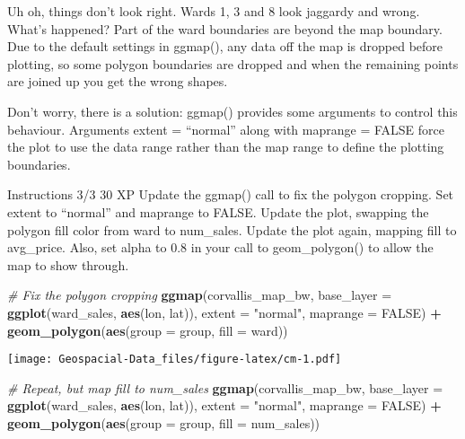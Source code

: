 \documentclass[]{article}
\newenvironment{Shaded}{\begin{snugshade}}{\end{snugshade}}
\newcommand{\CommentTok}[1]{\textcolor[rgb]{0.56,0.35,0.01}{\textit{#1}}}
\newcommand{\DataTypeTok}[1]{\textcolor[rgb]{0.13,0.29,0.53}{#1}}
\newcommand{\KeywordTok}[1]{\textcolor[rgb]{0.13,0.29,0.53}{\textbf{#1}}}
\newcommand{\NormalTok}[1]{#1}
\newcommand{\OperatorTok}[1]{\textcolor[rgb]{0.81,0.36,0.00}{\textbf{#1}}}
\newcommand{\OtherTok}[1]{\textcolor[rgb]{0.56,0.35,0.01}{#1}}
\newcommand{\StringTok}[1]{\textcolor[rgb]{0.31,0.60,0.02}{#1}}
\begin{document}
Uh oh, things don't look right. Wards 1, 3 and 8 look jaggardy and
wrong. What's happened? Part of the ward boundaries are beyond the map
boundary. Due to the default settings in ggmap(), any data off the map
is dropped before plotting, so some polygon boundaries are dropped and
when the remaining points are joined up you get the wrong shapes.

Don't worry, there is a solution: ggmap() provides some arguments to
control this behaviour. Arguments extent = ``normal'' along with
maprange = FALSE force the plot to use the data range rather than the
map range to define the plotting boundaries.

Instructions 3/3 30 XP Update the ggmap() call to fix the polygon
cropping. Set extent to ``normal'' and maprange to FALSE. Update the
plot, swapping the polygon fill color from ward to num\_sales. Update
the plot again, mapping fill to avg\_price. Also, set alpha to 0.8 in
your call to geom\_polygon() to allow the map to show through.

\begin{Shaded}
\begin{Highlighting}[]
\CommentTok{# Fix the polygon cropping}
\KeywordTok{ggmap}\NormalTok{(corvallis_map_bw, }
      \DataTypeTok{base_layer =} \KeywordTok{ggplot}\NormalTok{(ward_sales, }\KeywordTok{aes}\NormalTok{(lon, lat)), }\DataTypeTok{extent =} \StringTok{"normal"}\NormalTok{, }\DataTypeTok{maprange =} \OtherTok{FALSE}\NormalTok{) }\OperatorTok{+}
\StringTok{  }\KeywordTok{geom_polygon}\NormalTok{(}\KeywordTok{aes}\NormalTok{(}\DataTypeTok{group =}\NormalTok{ group, }\DataTypeTok{fill =}\NormalTok{ ward))}
\end{Highlighting}
\end{Shaded}

\texttt{[image: Geospacial-Data\_files/figure-latex/cm-1.pdf]}

\begin{Shaded}
\begin{Highlighting}[]
\CommentTok{# Repeat, but map fill to num_sales}
\KeywordTok{ggmap}\NormalTok{(corvallis_map_bw, }
      \DataTypeTok{base_layer =} \KeywordTok{ggplot}\NormalTok{(ward_sales, }\KeywordTok{aes}\NormalTok{(lon, lat)),}
      \DataTypeTok{extent =} \StringTok{"normal"}\NormalTok{, }\DataTypeTok{maprange =} \OtherTok{FALSE}\NormalTok{) }\OperatorTok{+}
\StringTok{  }\KeywordTok{geom_polygon}\NormalTok{(}\KeywordTok{aes}\NormalTok{(}\DataTypeTok{group =}\NormalTok{ group, }\DataTypeTok{fill =}\NormalTok{ num_sales))}
\end{Highlighting}
\end{Shaded}
\end{document}
